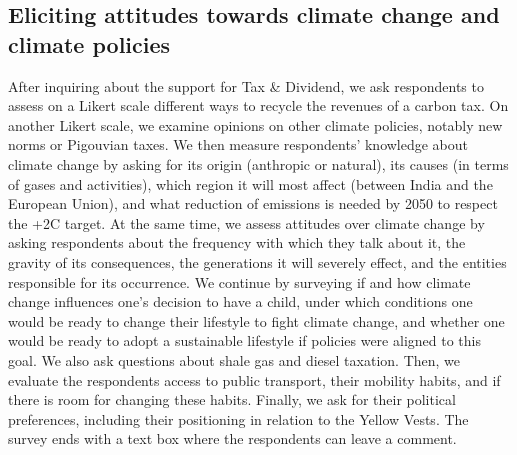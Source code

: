 \documentclass[english,5p,authoryear]{elsarticle}
\begin{document}

    \subsection{Eliciting attitudes towards climate change and climate policies}
After inquiring about the support for Tax \& Dividend, we ask respondents to assess on a Likert scale different ways to recycle the revenues of a carbon tax. On another Likert scale, we examine opinions on other climate policies, notably new norms or Pigouvian taxes. We then measure respondents' knowledge about climate change by asking for its origin (anthropic or natural), its causes (in terms of gases and activities), which region it will most affect (between India and the European Union), and what reduction of emissions is needed by 2050 to respect the +2\textdegree{}C target. At the same time, we assess attitudes over climate change by asking respondents about the frequency with which they talk about it, the gravity of its consequences, the generations it will severely effect, and the entities responsible for its occurrence. We continue by surveying if and how climate change influences one's decision to have a child, under which conditions one would be ready to change their lifestyle to fight climate change, and whether one would be ready to adopt a sustainable lifestyle if policies were aligned to this goal. We also ask questions about shale gas and diesel taxation. Then, we evaluate the respondents access to public transport, their mobility habits, and if there is room for changing these habits. Finally, we ask for their political preferences, including their positioning in relation to the Yellow Vests. The survey ends with a text box where the respondents can leave a comment.
\end{document}
